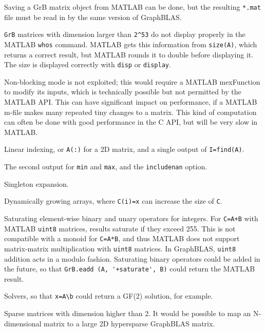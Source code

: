\documentclass[12pt]{article}
\newenvironment{packed_itemize}{
\begin{itemize}
  \setlength{\itemsep}{1pt}
  \setlength{\parskip}{0pt}
  \setlength{\parsep}{0pt}
}{\end{itemize}}
\begin{document}
\begin{packed_itemize}
    \item Saving a GrB matrix object from MATLAB can be done, but the
        resulting \verb'*.mat' file must be read in by the same version
        of GraphBLAS.
    \item \verb'GrB' matrices with dimension larger than \verb'2^53' do not
        display properly in the MATLAB \verb'whos' command.  MATLAB gets this
        information from \verb'size(A)', which returns a correct result, but
        MATLAB rounds it to double before displaying it.  The size is displayed
        correctly with \verb'disp' or \verb'display'.
    \item Non-blocking mode is not exploited; this would require
        a MATLAB mexFunction to modify its inputs, which is
        technically possible but not permitted by the MATLAB API.
        This can have significant impact on performance, if a MATLAB
        m-file makes many repeated tiny changes to a matrix.  This kind of
        computation can often be done with good performance in the C API,
        but will be very slow in MATLAB.
    \item Linear indexing, or \verb'A(:)' for a 2D matrix, and
        a single output of \verb'I=find(A)'.
    \item The second output for \verb'min' and \verb'max',
        and the \verb'includenan' option.
    \item Singleton expansion.
    \item Dynamically growing arrays, where \verb'C(i)=x' can increase
        the size of \verb'C'.
    \item Saturating element-wise binary and unary operators for integers.
        For \verb'C=A+B' with MATLAB \verb'uint8' matrices, results
        saturate if they exceed 255.  This is not compatible with
        a monoid for \verb'C=A*B', and thus MATLAB does not support
        matrix-matrix multiplication with \verb'uint8' matrices.
        In GraphBLAS, \verb'uint8' addition acts in a modulo fashion.
        Saturating binary operators could be added in the future,
        so that \verb"GrB.eadd (A, '+saturate', B)" could return the
        MATLAB result.
    \item Solvers, so that \verb'x=A\b' could return a GF(2) solution,
        for example.
    \item Sparse matrices with dimension higher than 2.  It would be
        possible to map an N-dimensional matrix to a large 2D
        hypersparse GraphBLAS matrix.
\end{packed_itemize}
\end{document}
